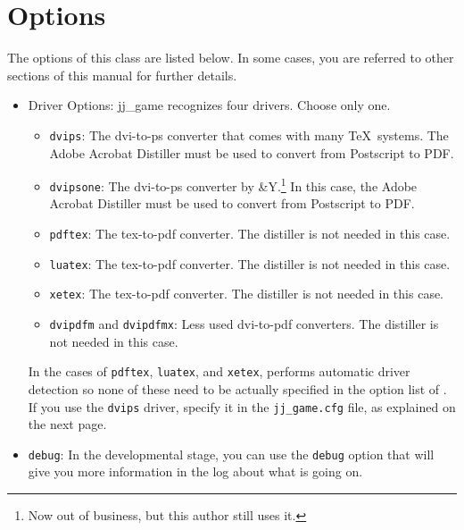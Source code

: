 \documentclass{article}
\def\jj{\textsf{jj\_game}}
\begin{document}
\section{Options}

The options of this class are listed below. In some cases, you are referred to
other sections of this manual for further details.
\begin{itemize}
\item Driver Options: {\jj} recognizes four drivers. Choose only one.
\begin{itemize}
\item \texttt{dvips}: The dvi-to-ps converter that comes with many \TeX\
    systems.  The Adobe Acrobat Distiller must be used to convert from
    Postscript to PDF.

\item \texttt{dvipsone}: The dvi-to-ps converter by \Y&Y.\footnote{Now
    out of business, but this author still uses it.}  In this case, the
    Adobe Acrobat Distiller must be used to convert from Postscript to
    PDF.

\item \texttt{pdftex}: The tex-to-pdf converter.  The distiller is not
    needed in this case.

\item \texttt{luatex}: The tex-to-pdf converter. The distiller is not
    needed in this case.

\item \texttt{xetex}: The tex-to-pdf converter. The distiller is not
    needed in this case.

\item \texttt{dvipdfm} and \texttt{dvipdfmx}: Less used dvi-to-pdf
    converters.  The distiller is not needed in this case.
\end{itemize}
In the cases of \texttt{pdftex}, \texttt{luatex}, and \texttt{xetex}, \pkg{\jj} performs automatic driver detection
so none of these need to be actually specified in the option list of \pkg{\jj}. If you use
the \texttt{dvips} driver, specify it in the \texttt{jj\_game.cfg} file, as explained on the next page.


\item \texttt{debug}: In the developmental stage, you can use the
\texttt{debug} option that will give you more information in the log
about what is going on.


\end{itemize}
\end{document}
